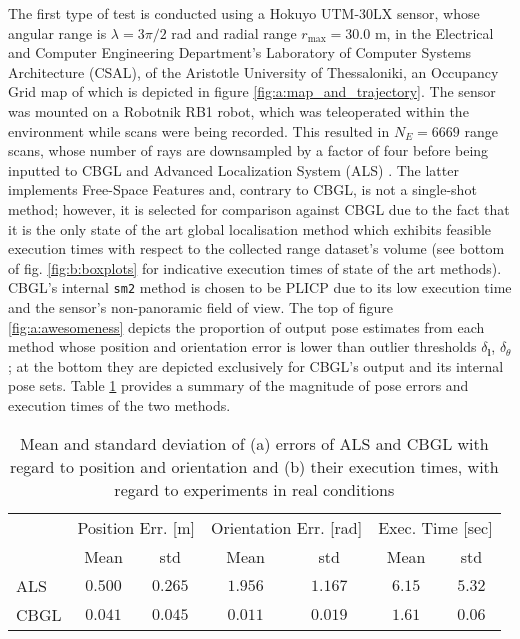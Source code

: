 The first type of test is conducted using a Hokuyo UTM-30LX sensor, whose
angular range is $\lambda = 3\pi/2$ rad and radial range $r_{\max} = 30.0$ m,
in the  Electrical and Computer Engineering Department's Laboratory of Computer
Systems Architecture (CSAL), of the Aristotle University of Thessaloniki, an
Occupancy Grid map of which is depicted in figure
\ref{fig:a:map_and_trajectory}. The sensor was mounted on a Robotnik RB1 robot,
which was teleoperated within the environment while scans were being recorded.
This resulted in $N_E = 6669$ range scans, whose number of rays are downsampled
by a factor of four before being inputted to CBGL and Advanced Localization
System (ALS) \cite{als_jp}. The latter implements Free-Space Features
\cite{als_eth} and, contrary to CBGL, is not a single-shot method;
however, it is selected for comparison against CBGL due to the fact that it is
the only state of the art global localisation method which exhibits feasible
execution times with respect to the collected range dataset's volume (see
bottom of fig.  \ref{fig:b:boxplots} for indicative execution times of state of
the art methods). CBGL's internal \texttt{sm2} method is chosen to be PLICP
\cite{Censi2008c} due to its low execution time and the sensor's non-panoramic
field of view. The top of figure \ref{fig:a:awesomeness} depicts the proportion
of output pose estimates from each method whose position and orientation error
is lower than outlier thresholds $\delta_{\bm{l}}$, $\delta_{\theta}$; at the
bottom they are depicted exclusively for CBGL's output and its internal pose
sets. Table \ref{tbl:a} provides a summary of the magnitude of pose errors and
execution times of the two methods.

\begin{table}[]\footnotesize
\begin{tabular}{@{}lcccccc@{}}
     & \multicolumn{2}{l}{Position Err. {[}m{]}} & \multicolumn{2}{l}{Orientation Err. {[}rad{]}} & \multicolumn{2}{l}{Exec. Time {[}sec{]}} \\
     & Mean              & std              & Mean                & std                 & Mean                & std                \\ \midrule
ALS  & $0.500 $          & $0.265 $         & $1.956 $            & $1.167 $            & $6.15 $             & $5.32 $            \\
CBGL & $0.041 $          & $0.045 $         & $0.011 $            & $0.019 $            & $1.61 $             & $0.06 $            \\ \bottomrule
\end{tabular}
  \caption{\small Mean and standard deviation of (a) errors of ALS and CBGL with
                regard to position and orientation and (b) their execution times,
                with regard to experiments in real conditions}
\label{tbl:a}
\end{table}

